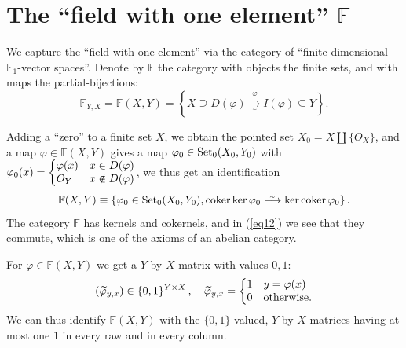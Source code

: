 \documentclass[leqno]{article}
\numberwithin{equation}{section}
\begin{document}
\section{The ``field with one element'' ${\mathbb F}$}

We capture the ``field with one element'' via the category of ``finite dimensional ${\mathbb F}_1$-vector spaces''. Denote by ${\mathbb F}$ the category with objects the finite sets, and with maps the partial-bijections:
\begin{equation}
\label{eq11}
{\mathbb F}_{Y,X} = {\mathbb F} (X,Y) = \left\{ X \supseteq D (\varphi) \underset{^\sim}{\overset{\varphi}{\longrightarrow}} I(\varphi) \subseteq Y \right\} .
\end{equation}

\bigskip

 Adding a ``zero'' to a finite set $X$, we obtain the pointed set $X_0 = X \amalg \{O_X \}$, and a map $\varphi \in {\mathbb F} (X,Y)$ gives a map $\varphi_0 \in {\rm Set}_0 (X_0 , Y_0)$ with $\varphi_0 (x) = \left\{ \begin{matrix} \varphi (x) &x \in D(\varphi) \\ O_Y \hfill &x \notin D(\varphi) \end{matrix} \right.$, we thus get an identification
\begin{equation}
\label{eq12}
{\mathbb F} (X,Y) \equiv \left\{ \varphi_0 \in {\rm Set}_0 (X_0 , Y_0), {\rm coker} \ker \varphi_0 \overset{_\sim}{\longrightarrow} \ker {\rm coker} \, \varphi_0 \right\} .
\end{equation}
The category ${\mathbb F}$ has kernels and cokernels, and in (\ref{eq12}) we see that they commute, which is one of the axioms of an abelian category.

\bigskip

 For $\varphi \in {\mathbb F} (X,Y)$ we get a $Y$ by $X$ matrix with values $0,1$:
\begin{equation}
\label{eq13}
(\widetilde\varphi_{y,x}) \in \{0,1\}^{Y \times X} \, , \quad \widetilde\varphi_{y,x} = \left\{ \begin{matrix} 1 &y = \varphi (x) \hfill \\ 0 &\mbox{otherwise.} \hfill \end{matrix} \right.
\end{equation}
We can thus identify ${\mathbb F} (X,Y)$ with the $\{0,1\}$-valued, $Y$ by $X$ matrices having at most one $1$ in every raw and in every column.
\end{document}
